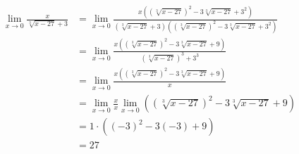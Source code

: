 \begin{soluciones}
\begin{enumerate}[label=\alph*)]
    $$
    \begin{aligned}
    \lim _{x \rightarrow 0} \frac{x}{\sqrt[3]{x-27}+3} & =\lim _{x \rightarrow 0} \frac{x\left((\sqrt[3]{x-27})^2-3 \sqrt[3]{x-27}+3^2\right)}{(\sqrt[3]{x-27}+3)\left((\sqrt[3]{x-27})^2-3 \sqrt[3]{x-27}+3^2\right)} \\
    & =\lim _{x \rightarrow 0} \frac{x\left((\sqrt[3]{x-27})^2-3 \sqrt[3]{x-27}+9\right)}{(\sqrt[3]{x-27})^3+3^3} \\
    & =\lim _{x \rightarrow 0} \frac{x\left((\sqrt[3]{x-27})^2-3 \sqrt[3]{x-27}+9\right)}{x} \\
    & =\lim _{x \rightarrow 0} \frac{x}{x} \lim _{x \rightarrow 0}\left((\sqrt[3]{x-27})^2-3 \sqrt[3]{x-27}+9\right) \\
    & =1 \cdot\left((-3)^2-3(-3)+9\right) \\
    & =27
    \end{aligned}
    $$
  \end{enumerate}
\end{soluciones}